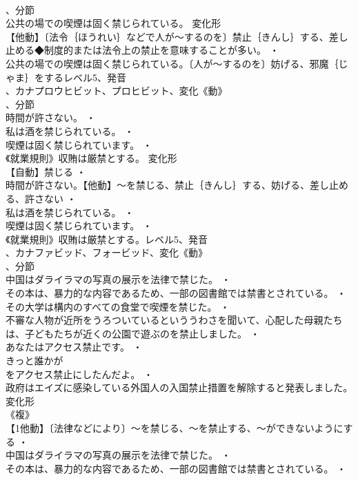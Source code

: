 \documentclass[8pt]{extreport}
\begin{document}
\begin{CJK}{UTF8}{min}
\\	、分節
\\	公共の場での喫煙は固く禁じられている。	変化形 
\\	【他動】〔法令｛ほうれい｝などで人が～するのを〕禁止｛きんし｝する、差し止める◆制度的または法令上の禁止を意味することが多い。 ・
\\	公共の場での喫煙は固く禁じられている。〔人が～するのを〕妨げる、邪魔｛じゃま｝をするレベル5、発音
\\	、カナプロウヒビット、プロヒビット、変化《動》
\\	、分節
\\	時間が許さない。 ・
\\	私は酒を禁じられている。 ・
\\	喫煙は固く禁じられています。 ・
\\	《就業規則》収賄は厳禁とする。	変化形 
\\	【自動】禁じる ・
\\	時間が許さない。【他動】～を禁じる、禁止｛きんし｝する、妨げる、差し止める、許さない ・
\\	私は酒を禁じられている。 ・
\\	喫煙は固く禁じられています。 ・
\\	《就業規則》収賄は厳禁とする。レベル5、発音
\\	、カナファビッド、フォービッド、変化《動》
\\	、分節
\\	中国はダライラマの写真の展示を法律で禁じた。 ・
\\	その本は、暴力的な内容であるため、一部の図書館では禁書とされている。 ・
\\	その大学は構内のすべての食堂で喫煙を禁じた。 ・
\\	不審な人物が近所をうろついているといううわさを聞いて、心配した母親たちは、子どもたちが近くの公園で遊ぶのを禁止しました。 ・
\\	あなたはアクセス禁止です。 ・
\\	きっと誰かが
\\	をアクセス禁止にしたんだよ。 ・
\\	政府はエイズに感染している外国人の入国禁止措置を解除すると発表しました。	変化形 
\\	《複》
\\	【1他動】〔法律などにより〕～を禁じる、～を禁止する、～ができないようにする ・
\\	中国はダライラマの写真の展示を法律で禁じた。 ・
\\	その本は、暴力的な内容であるため、一部の図書館では禁書とされている。 ・

\end{CJK}
\end{document}

